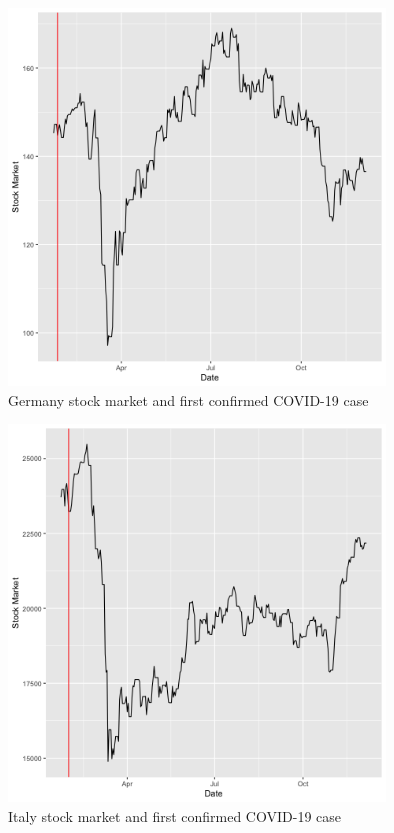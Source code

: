 \documentclass[11pt]{article}
\begin{document}
\begin{figure}[!h]
\centering
  \includegraphics[width=100mm]{R-Code/plots/germanyFinance.png}   
  \caption{Germany stock market and first confirmed COVID-19 case}
\end{figure}

\begin{figure}[!h]
\centering
  \includegraphics[width=100mm]{R-Code/plots/italyFinance.png}  
  \caption{Italy stock market and first confirmed COVID-19 case}
\end{figure}
\end{document}
